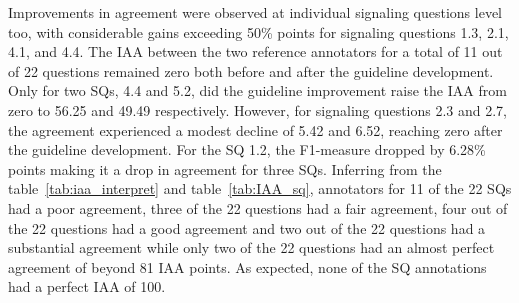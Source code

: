 \documentclass[sn-mathphys,Numbered]{sn-jnl}%
\theoremstyle{thmstyleone}%
\theoremstyle{thmstyletwo}%
\theoremstyle{thmstylethree}%
\begin{document}
Improvements in agreement were observed at individual signaling questions level too, with considerable gains exceeding 50\% points for signaling questions 1.3, 2.1, 4.1, and 4.4.
The IAA between the two reference annotators for a total of 11 out of 22 questions remained zero both before and after the guideline development.
Only for two SQs, 4.4 and 5.2, did the guideline improvement raise the IAA from zero to 56.25 and 49.49 respectively.
However, for signaling questions 2.3 and 2.7, the agreement experienced a modest decline of 5.42 and 6.52, reaching zero after the guideline development.
For the SQ 1.2, the F1-measure dropped by 6.28\% points making it a drop in agreement for three SQs.
Inferring from the table~\ref{tab:iaa_interpret} and table~\ref{tab:IAA_sq}, annotators for 11 of the 22 SQs had a poor agreement, three of the 22 questions had a fair agreement, four out of the 22 questions had a good agreement and two out of the 22 questions had a substantial agreement while only two of the 22 questions had an almost perfect agreement of beyond 81 IAA points.
As expected, none of the SQ annotations had a perfect IAA of 100.
%
%
%
\end{document}
